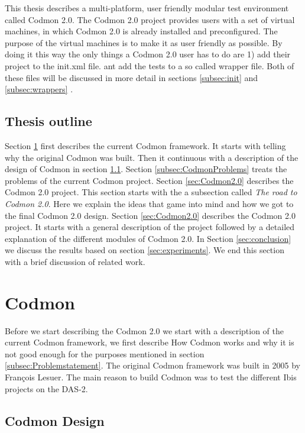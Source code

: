 \documentclass[a4paper,10pt]{scrartcl}
\newcommand{\project}{Codmon 2.0}
\begin{document}
\noindent This thesis describes a multi-platform, user friendly modular test environment called \project{}. The \project{} project provides users with a set of virtual machines,
in which \project{} is already installed and preconfigured. The purpose of the virtual machines is to make it as user friendly as possible. By doing it this way the only things
a \project{} user has to do are 1) add their project  to the init.xml file. ant add the tests to a so called wrapper file. Both of these files will be discussed in more detail in 
sections \ref{subsec:init} and \ref{subsec:wrappers} .


\subsection{Thesis outline}
\label{subsec:Thesisoutline}
Section \ref{sec:codmon} first describes the current Codmon framework. It starts with telling why the original Codmon was built. Then it continuous with a description of the design of Codmon
in section \ref{subsec:CodmonDesign}. Section \ref{subsec:CodmonProblems} treats the problems of the current Codmon project. Section \ref{sec:Codmon2.0} describes the \project{} project. This
section starts with the  a subsection called \emph{The road to \project{}}. Here we explain the ideas that game into mind and how we got to the final \project{} design. Section \ref{sec:Codmon2.0}
describes the \project{} project. It starts with a general description of the project followed by a detailed explanation of the different modules of \project{}. In Section \ref{sec:conclusion} we
discuss the results based on section \ref{sec:experiments}. We end this section with a brief discussion of related work.

\newpage

\section{Codmon}
\label{sec:codmon}
Before we start describing the \project{} we start with a description of the current Codmon framework, we first describe How Codmon works and why it is not good enough for the purposes mentioned
in section \ref{subsec:Problemstatement}. The original Codmon framework was built in 2005 by François Lesuer\cite{Codmon}. The main reason to build Codmon was to test the different Ibis
projects\cite{Ibis}\cite{Satin}\cite{MPJ}\cite{IPL}\cite{GMI} on the DAS-2.

\subsection{Codmon Design}
\label{subsec:CodmonDesign}
\end{document}
